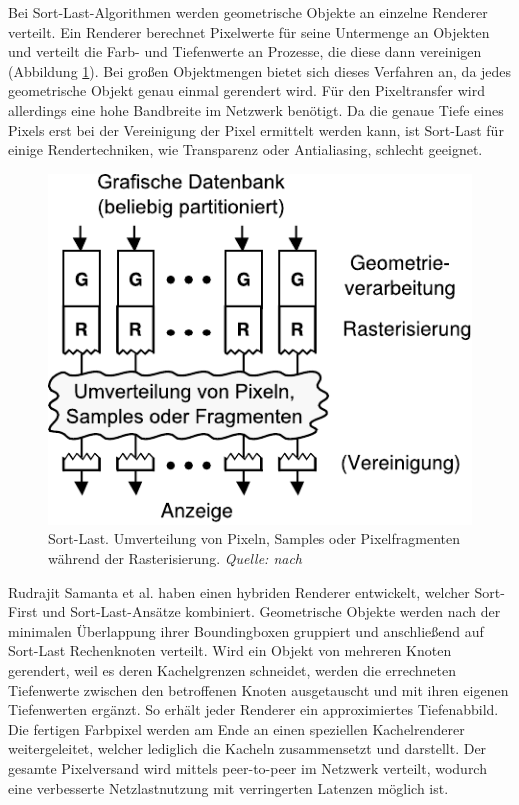 Bei Sort-Last-Algorithmen werden geometrische Objekte an einzelne Renderer verteilt. Ein Renderer berechnet Pixelwerte für seine Untermenge an Objekten und verteilt die Farb- und Tiefenwerte an Prozesse, die diese dann vereinigen (Abbildung \ref{fig:relwork:sortlast}). Bei großen Objektmengen bietet sich dieses Verfahren an, da jedes geometrische Objekt genau einmal gerendert wird. Für den Pixeltransfer wird allerdings eine hohe Bandbreite im Netzwerk benötigt. Da die genaue Tiefe eines Pixels erst bei der Vereinigung der Pixel ermittelt werden kann, ist Sort-Last für einige Rendertechniken, wie Transparenz oder Antialiasing, schlecht geeignet.
\begin{figure}
 \centering
  \includegraphics[scale=0.8]{images/sort-last.pdf}
  \caption{Sort-Last. Umverteilung von Pixeln, Samples oder Pixelfragmenten während der Rasterisierung. \textit{Quelle: nach}}
 \label{fig:relwork:sortlast}
\end{figure}
Rudrajit Samanta et al. haben einen hybriden Renderer entwickelt, welcher Sort-First und Sort-Last-Ansätze kombiniert. Geometrische Objekte werden nach der minimalen Überlappung ihrer Boundingboxen gruppiert und anschließend auf Sort-Last Rechenknoten verteilt. Wird ein Objekt von mehreren Knoten gerendert, weil es deren Kachelgrenzen schneidet, werden die errechneten Tiefenwerte zwischen den betroffenen Knoten ausgetauscht und mit ihren eigenen Tiefenwerten ergänzt. So erhält jeder Renderer ein approximiertes Tiefenabbild. Die fertigen Farbpixel werden am Ende an einen speziellen Kachelrenderer weitergeleitet, welcher lediglich die Kacheln zusammensetzt und darstellt. Der gesamte Pixelversand wird mittels peer-to-peer im Netz\-werk verteilt, wodurch eine verbesserte Netzlastnutzung mit verringerten Latenzen möglich ist.


